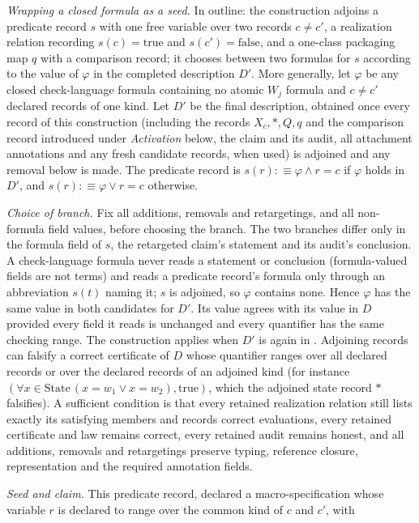 \begin{remark}
\emph{Wrapping a closed formula as a \Ptwo{} seed.} In outline: the construction adjoins a predicate record \(s\) with one free variable over two records \(c\ne c'\), a realization relation recording \(s(c)=\mathrm{true}\) and \(s(c')=\mathrm{false}\), and a one-class packaging map \(q\) with a comparison record; it chooses between two formulas for \(s\) according to the value of \(\varphi\) in the completed description \(D'\). More generally, let \(\varphi\) be any closed check-language formula containing
no atomic \(W_j\) formula and
\(c\ne c'\) declared records of one kind. Let \(D'\) be the final description, obtained once every record of this construction (including the records \(X_c,*,Q,q\) and the comparison record introduced under \emph{Activation} below, the \Ptwo{} claim and its audit, all attachment annotations and any fresh candidate records, when used) is adjoined and any removal below is made. The predicate record is \(s(r):\equiv\varphi\wedge r=c\) if \(\varphi\) holds in \(D'\), and \(s(r):\equiv\varphi\vee r=c\) otherwise. \par\emph{Choice of branch.} Fix all additions, removals and retargetings, and all non-formula field values, before choosing the branch. The two branches differ only in the formula field of \(s\), the retargeted claim's statement and its audit's conclusion. A check-language formula never reads a statement or conclusion (formula-valued fields are not terms) and reads a predicate record's formula only through an abbreviation \(s(t)\) naming it; \(s\) is adjoined, so \(\varphi\) contains none. Hence \(\varphi\) has the same value in both candidates for \(D'\). Its value agrees with its value in \(D\) provided every field it reads is unchanged and every quantifier has the same checking range. The construction applies when \(D'\) is again in \FATCD{}. Adjoining records can falsify a correct certificate of \(D\) whose quantifier ranges over all declared records or over the declared records of an adjoined kind (for instance \((\forall x\in\mathrm{State}\,(x=w_1\vee x=w_2),\mathrm{true})\), which the adjoined state record \(*\) falsifies). A sufficient condition is that every retained realization relation still lists exactly its satisfying members and records correct evaluations, every retained certificate and law remains correct, every retained audit remains honest, and all additions, removals and retargetings preserve typing, reference closure, representation and the required annotation fields. \par\emph{Seed and claim.} This predicate record, declared a macro-specification whose variable \(r\) is declared to range over the common kind of \(c\) and \(c'\), with

\end{remark}
